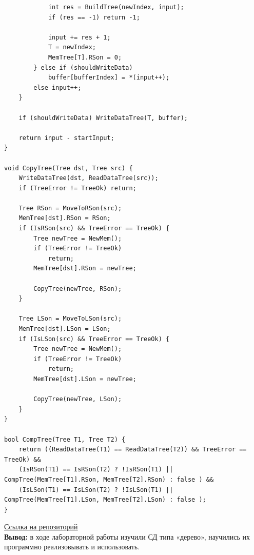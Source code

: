 \documentclass[a4paper,14pt]{extarticle}
\begin{document}
\begin{enumerate}
\begin{verbatim}
            int res = BuildTree(newIndex, input);
            if (res == -1) return -1;

            input += res + 1;
            T = newIndex;
            MemTree[T].RSon = 0;
        } else if (shouldWriteData)
            buffer[bufferIndex] = *(input++);
        else input++;
    }

    if (shouldWriteData) WriteDataTree(T, buffer);

    return input - startInput;
}

void CopyTree(Tree dst, Tree src) {
    WriteDataTree(dst, ReadDataTree(src));
    if (TreeError != TreeOk) return;

    Tree RSon = MoveToRSon(src);
    MemTree[dst].RSon = RSon;
    if (IsRSon(src) && TreeError == TreeOk) {
        Tree newTree = NewMem();
        if (TreeError != TreeOk)
            return;
        MemTree[dst].RSon = newTree;

        CopyTree(newTree, RSon);
    }

    Tree LSon = MoveToLSon(src);
    MemTree[dst].LSon = LSon;
    if (IsLSon(src) && TreeError == TreeOk) {
        Tree newTree = NewMem();
        if (TreeError != TreeOk)
            return;
        MemTree[dst].LSon = newTree;

        CopyTree(newTree, LSon);
    }
}

bool CompTree(Tree T1, Tree T2) {
    return ((ReadDataTree(T1) == ReadDataTree(T2)) && TreeError == TreeOk) && 
    (IsRSon(T1) == IsRSon(T2) ? !IsRSon(T1) || CompTree(MemTree[T1].RSon, MemTree[T2].RSon) : false ) && 
    (IsLSon(T1) == IsLSon(T2) ? !IsLSon(T1) || CompTree(MemTree[T1].LSon, MemTree[T2].LSon) : false );
}
\end{verbatim}
\end{enumerate}
\href{https://github.com/IAmProgrammist/algorithms_and_data_structures/tree/main}{Ссылка на репозиторий}\\
\textbf{Вывод: } в ходе лабораторной работы изучили СД типа «дерево», научились их программно 
реализовывать и использовать.
\end{document}
